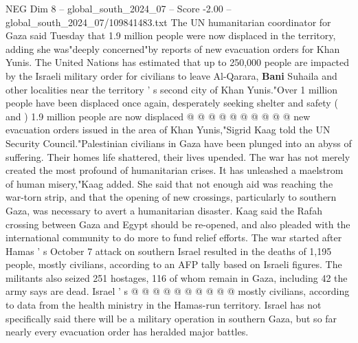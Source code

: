 \begin{textsample}{NEG Dim 8 – global\_south\_2024\_07 – Score -2.00 – global\_south\_2024\_07/109841483.txt}
The UN humanitarian coordinator for Gaza said Tuesday that 1.9 million people were now displaced in the territory, adding she was"deeply concerned"by reports of new evacuation orders for Khan Yunis.
The United Nations has estimated that up to 250,000 people are impacted by the Israeli military order for civilians to leave Al-Qarara, \textbf{Bani} Suhaila and other localities near the territory ' s second city of Khan Yunis."Over 1 million people have been displaced once again, desperately seeking shelter and safety ( and ) 1.9 million people are now displaced @ @ @ @ @ @ @ @ @ @ new evacuation orders issued in the area of Khan Yunis,"Sigrid Kaag told the UN Security Council."Palestinian civilians in Gaza have been plunged into an abyss of suffering.
Their homes life shattered, their lives upended.
The war has not merely created the most profound of humanitarian crises.
It has unleashed a maelstrom of human misery,"Kaag added.
She said that not enough aid was reaching the war-torn strip, and that the opening of new crossings, particularly to southern Gaza, was necessary to avert a humanitarian disaster.
Kaag said the Rafah crossing between Gaza and Egypt should be re-opened, and also pleaded with the international community to do more to fund relief efforts.
The war started after Hamas ' s October 7 attack on southern Israel resulted in the deaths of 1,195 people, mostly civilians, according to an AFP tally based on Israeli figures.
The militants also seized 251 hostages, 116 of whom remain in Gaza, including 42 the army says are dead.
Israel ' s @ @ @ @ @ @ @ @ @ @ mostly civilians, according to data from the health ministry in the Hamas-run territory.
Israel has not specifically said there will be a military operation in southern Gaza, but so far nearly every evacuation order has heralded major battles.

\end{textsample}
